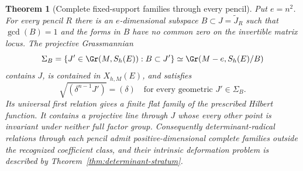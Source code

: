 \documentclass[11pt,reqno]{amsart}
\numberwithin{equation}{section}
\newtheorem{theorem}{Theorem}[section]
\theoremstyle{definition}\newtheorem{definition}[theorem]{Definition}
\theoremstyle{remark}\newtheorem{remark}[theorem]{Remark}
\begin{document}
\begin{theorem}[Complete fixed-support families through every pencil]
\label{thm:fixed-support-grassmannians}
Put \(e=n^2\).  For every pencil \(R\) there is an \(e\)-dimensional
subspace \(B\subset J=\widetilde J_R\) such that
\(\gcd(B)=1\) and the forms in \(B\) have no common zero on the
invertible matrix locus.  The projective Grassmannian
\begin{equation}\label{eq:fixed-support-grassmannian}
 \Sigma_B=\{J'\in\Gr(M,S_h(E)):B\subset J'\}
          \simeq\Gr(M-e,S_h(E)/B)
\end{equation}
contains \(J\), is contained in \(X_{h,M}(E)\), and satisfies
\begin{equation}\label{eq:fixed-radical}
              \sqrt{(\delta^{n-1}J')}=(\delta)
                         \quad\text{for every geometric }J'\in\Sigma_B.
\end{equation}
Its universal first relation gives a finite flat family of the
prescribed Hilbert function.  It contains a projective line through
\(J\) whose every other point is invariant under neither full
factor group.  Consequently determinant-radical relations through
each pencil admit positive-dimensional complete families outside
the recognized coefficient class, and their intrinsic deformation
problem is described by Theorem~\ref{thm:determinant-stratum}.
\end{theorem}
\end{document}
